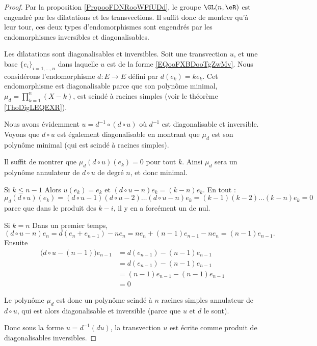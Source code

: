 \begin{proof}
    Par la proposition \ref{PropooFDNRooWFfUDd}, le groupe \( \GL(n,\eR)\) est engendré par les dilatations et les transvections. Il suffit donc de montrer qu'à leur tour, ces deux types d'endomorphismes sont engendrés par les endomorphismes inversibles et diagonalisables.

    Les dilatations sont diagonalisables et inversibles. Soit une transvection \( u\), et une base \( \{ e_i \}_{i=1,\ldots, n}\) dans laquelle \( u\) est de la forme \eqref{EQooFXBDooTgZwMv}. Nous considérons l'endomorphisme \( d\colon E\to E\) défini par \( d(e_k)=ke_k\). Cet endomorphisme est diagonalisable parce que son polynôme minimal, \( \mu_d=\prod_{k=1}^n(X-k)\), est scindé à racines simples (voir le théorème \ref{ThoDigLEQEXR}).

    Nous avons évidemment \( u= d^{-1}\circ(d\circ u) \) où \( d^{-1}\) est diagonalisable et inversible. Voyons que \( d\circ u\) est également diagonalisable en montrant que \( \mu_d\) est son polynôme minimal (qui est scindé à racines simples).

    Il suffit de montrer que \( \mu_d(d\circ u)(e_k)=0\) pour tout \( k\). Ainsi \( \mu_d\) sera un polynôme annulateur de \( d\circ u\) de degré \( n\), et donc minimal.
    \begin{subproof}
        \item[Si \( k\leq n-1\)]
            Alors \( u(e_k)=e_k\) et \( (d\circ u-n)e_k=(k-n)e_k\). En tout :
            \begin{equation}
                \mu_d(d\circ u)(e_k)=(d\circ u-1)(d\circ u-2)\ldots (d\circ u-n)e_k=(k-1)(k-2)\ldots (k-n)e_k=0
            \end{equation}
            parce que dans le produit des \( k-i\), il y en a forcément un de nul.
        \item[Si \( k=n\)]
            Dans un premier temps,
            \begin{equation}
                (d\circ u-n)e_n=d(e_n+e_{n-1})-ne_n=ne_n+(n-1)e_{n-1}-ne_n=(n-1)e_{n-1}.
            \end{equation}
            Ensuite 
            \begin{subequations}
                \begin{align}
                    \big( d\circ u-(n-1) \big)e_{n-1}&=d(e_{n-1})-(n-1)e_{n-1}\\
                    &=d(e_{n-1})-(n-1)e_{n-1}\\
                    &=(n-1)e_{n-1}-(n-1)e_{n-1}\\
                    &=0
                \end{align}
            \end{subequations}
    \end{subproof}
    Le polynôme \( \mu_d\) est donc un polynôme scindé à \( n\) racines simples annulateur de \( d\circ u\), qui est alors diagonalisable et inversible (parce que \( u\) et \( d\) le sont).

    Donc sous la forme \( u=d^{-1}(du)\), la transvection \( u\) est écrite comme produit de diagonalisables inversibles.
\end{proof}

